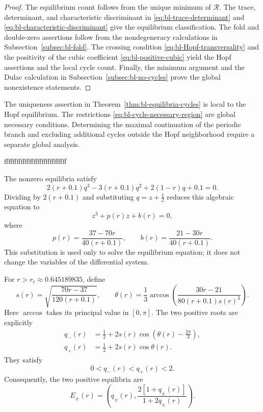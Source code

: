 \documentclass[11pt,reqno]{amsart}
\theoremstyle{plain}
\theoremstyle{definition}
\theoremstyle{remark}
\begin{document}
\begin{proof}
The equilibrium count follows from the unique minimum of
$\mathcal R$. The trace, determinant, and characteristic
discriminant in \eqref{eq:bl-trace-determinant} and
\eqref{eq:bl-characteristic-discriminant} give the equilibrium
classification. The fold and double-zero assertions follow
from the nondegeneracy calculations in
Subsection~\ref{subsec:bl-fold}. The crossing condition
\eqref{eq:bl-Hopf-transversality} and the positivity of the
cubic coefficient \eqref{eq:bl-positive-cubic} yield the Hopf
assertions and the local cycle count. Finally, the minimum
argument and the Dulac calculation in
Subsection~\ref{subsec:bl-no-cycles} prove the global
nonexistence statements.
\end{proof}

The uniqueness assertion in
Theorem~\ref{thm:bl-equilibria-cycles} is local to the Hopf
equilibrium. The restrictions
\eqref{eq:bl-cycle-necessary-region} are global necessary
conditions. Determining the maximal continuation of the
periodic branch and excluding additional cycles outside the
Hopf neighborhood require a separate global analysis.


















ffffffffffffffffffffffffffffff

The nonzero equilibria satisfy
\[
2(r+0.1)q^3-3(r+0.1)q^2+2(1-r)q+0.1=0.
\]
Dividing by $2(r+0.1)$ and substituting $q=z+\tfrac12$
reduces this algebraic equation to
\[
z^3+p(r)z+b(r)=0,
\]
where
\[
p(r)=\frac{37-70r}{40(r+0.1)},
\qquad
b(r)=\frac{21-30r}{40(r+0.1)}.
\]
This substitution is used only to solve the equilibrium
equation; it does not change the variables of the
differential system.

For $r>r_c\approx0.645189835$, define
\begin{equation}
s(r)=\sqrt{\frac{70r-37}{120(r+0.1)}},
\qquad
\theta(r)=\frac13\arccos\left(
\frac{30r-21}{80(r+0.1)s(r)^3}
\right).
\label{eq:cubic-auxiliary}
\end{equation}
Here $\arccos$ takes its principal value in $[0,\pi]$.
The two positive roots are explicitly
\begin{equation}
\boxed{
\begin{aligned}
q_-(r)
&=\frac12+2s(r)
\cos\left(\theta(r)-\frac{2\pi}{3}\right),\\
q_+(r)
&=\frac12+2s(r)\cos\theta(r).
\end{aligned}}
\label{eq:explicit-positive-roots}
\end{equation}
They satisfy
\[
0<q_-(r)<q_+(r)<2.
\]
Consequently, the two positive equilibria are
\begin{equation}
\boxed{
E_\pm(r)=
\left(
q_\pm(r),
\frac{2[1+q_\pm(r)]}{1+2q_\pm(r)}
\right).
}
\label{eq:explicit-positive-equilibria}
\end{equation}
\end{document}
